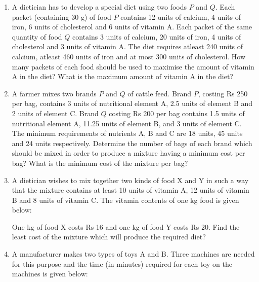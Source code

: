 \begin{enumerate}[label=\thesection.\arabic*,ref=\thesection.\theenumi]
\item A dietician has to develop a special diet using two foods $P$ and $Q$. Each packet (containing 30 g) of food $P$ contains 12 units of calcium, 4 units of iron, 6 units of cholesterol and 6 units of vitamin A. Each packet of the same quantity of food $Q$ contains 3 units of calcium, 20 units of iron, 4 units of cholesterol and 3 units of vitamin A. The diet requires atleast 240 units of calcium, atleast 460 units of iron and at most 300 units of cholesterol. How many packets of each food should be used to maximise the amount of vitamin A in the diet? What is the maximum amount of vitamin A in the diet?
\label{12/12/3/1}
%

\item A farmer mixes two brands $P$ and $Q$ of cattle feed. Brand $P$, costing Rs 250 per bag, contains 3 units of nutritional element A, 2.5 units of element B and 2 units of element C. Brand $Q$ costing Rs 200 per bag contains 1.5 units of nutritional element A, 11.25 units of element B, and 3 units of element C. The minimum requirements of nutrients A, B and C are 18 units, 45 units and 24 units respectively. Determine the number of bags of each brand which should be mixed in order to produce a mixture having a minimum cost per bag? What is the minimum cost of the mixture per bag?
\label{12/12/3/2}
%

\item A dietician wishes to mix together two kinds of food X and Y in such a way that the mixture contains at least 10 units of vitamin A, 12 units of vitamin B and 8 units of vitamin C. The vitamin contents of one kg food is given below:
\label{12/12/3/3}

\begin{table}[h]
\centering

\caption{}
\end{table}

One kg of food X costs Rs 16 and one kg of food Y costs Rs 20. Find the least cost of the mixture which will produce the required diet?
%

\item A manufacturer makes two types of toys A and B. Three machines are needed
for this purpose and the time (in minutes) required for each toy on the machines is given below:


\end{enumerate}
